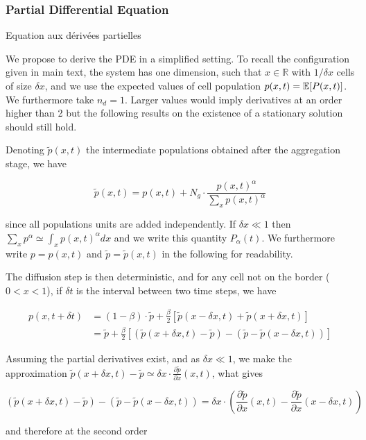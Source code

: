 \subsubsection{Partial Differential Equation}{Equation aux dérivées partielles}

We propose to derive the PDE in a simplified setting. To recall the configuration given in main text, the system has one dimension, such that $x\in \mathbb{R}$ with $1/\delta x$ cells of size $\delta x$, and we use the expected values of cell population $p(x,t) = \operatorname{\mathbb{E}}\!\left[P(x,t)\right]$. We furthermore take $n_d=1$. Larger values would imply derivatives at an order higher than 2 but the following results on the existence of a stationary solution should still hold. 

Denoting $\tilde{p}(x,t)$ the intermediate populations obtained after the aggregation stage, we have

\[
\tilde{p}(x,t) = p(x,t) + N_g\cdot \frac{p(x,t)^{\alpha}}{\sum_x p(x,t)^{\alpha}}
\]

since all populations units are added independently. If $\delta x \ll 1$ then $\sum_x p^{\alpha} \simeq \int_x p(x,t)^{\alpha}dx$ and we write this quantity $P_{\alpha}(t)$. We furthermore write $p=p(x,t)$ and $\tilde{p} = \tilde{p}(x,t)$ in the following for readability.

The diffusion step is then deterministic, and for any cell not on the border ($0<x<1$), if $\delta t$ is the interval between two time steps, we have

\[
\begin{split}
p(x,t+\delta t) & = (1 - \beta) \cdot \tilde{p} + \frac{\beta}{2} \left[\tilde{p}(x-\delta x,t) + \tilde{p}(x+\delta x,t)\right]\\
& = \tilde{p} + \frac{\beta}{2} \left[\left(\tilde{p}(x+\delta x,t) - \tilde{p}\right) - \left(\tilde{p} - \tilde{p}(x-\delta x,t)\right)\right]
\end{split}
\]

Assuming the partial derivatives exist, and as $\delta x \ll 1$, we make the approximation $\tilde{p}(x+\delta x,t) - \tilde{p} \simeq \delta x\cdot \frac{\partial \tilde{p}}{\partial{x}}(x,t)$, what gives 

\[
\left(\tilde{p}(x+\delta x,t) - \tilde{p}\right) - \left(\tilde{p} - \tilde{p}(x-\delta x,t)\right) = \delta x \cdot \left(\frac{\partial \tilde{p}}{\partial{x}}(x,t) - \frac{\partial \tilde{p}}{\partial{x}}(x - \delta x,t)\right)
\]

and therefore at the second order

